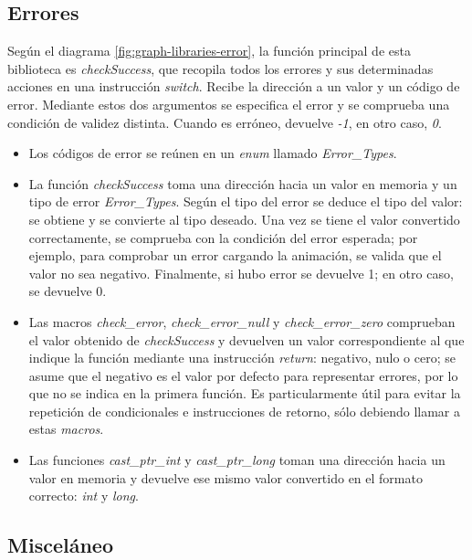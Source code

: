 \subsection{Errores}
Según el diagrama \ref{fig:graph-libraries-error}, la función principal de esta biblioteca es \textit{checkSuccess}, que recopila todos los errores y sus determinadas acciones en una instrucción \textit{switch}. Recibe la dirección a un valor y un código de error. Mediante estos dos argumentos se especifica el error y se comprueba una condición de validez distinta. Cuando es erróneo, devuelve \textit{-1}, en otro caso, \textit{0}.

\begin{itemize}
    \item Los códigos de error se reúnen en un \textit{enum} llamado \textit{Error\_Types}.
    
    \item La función \textit{checkSuccess} toma una dirección hacia un valor en memoria y un tipo de error \textit{Error\_Types}. Según el tipo del error se deduce el tipo del valor: se obtiene y se convierte al tipo deseado. Una vez se tiene el valor convertido correctamente, se comprueba con la condición del error esperada; por ejemplo, para comprobar un error cargando la animación, se valida que el valor no sea negativo. Finalmente, si hubo error se devuelve 1; en otro caso, se devuelve 0.

    \item Las macros \textit{check\_error}, \textit{check\_error\_null} y \textit{check\_error\_zero} comprueban el valor obtenido de \textit{checkSuccess} y devuelven un valor correspondiente al que indique la función mediante una instrucción \textit{return}: negativo, nulo o cero; se asume que el negativo es el valor por defecto para representar errores, por lo que no se indica en la primera función. Es particularmente útil para evitar la repetición de condicionales e instrucciones de retorno, sólo debiendo llamar a estas \textit{macros}.
    
    \item Las funciones \textit{cast\_ptr\_int} y \textit{cast\_ptr\_long} toman una dirección hacia un valor en memoria y devuelve ese mismo valor convertido en el formato correcto: \textit{int} y \textit{long}.
    
\end{itemize}

\subsection{Misceláneo}

